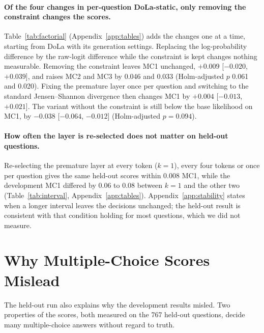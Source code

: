 \documentclass[11pt]{article}
\newcommand{\method}{per-question DoLa-static}
\begin{document}
\paragraph{Of the four changes in \method{}, only removing the constraint changes the scores.}
Table~\ref{tab:factorial} (Appendix~\ref{app:tables}) adds the changes one at a time, starting from DoLa with its generation settings.
Replacing the log-probability difference by the raw-logit difference while the constraint is kept changes nothing
measurable. Removing the constraint leaves MC1 unchanged, $+0.009$ [$-0.020$, $+0.039$], and raises MC2 and MC3 by 0.046 and
0.033 (Holm-adjusted $p$ 0.061 and 0.020).
Fixing the premature layer once per question and switching to the standard Jensen--Shannon divergence then changes
MC1 by $+0.004$ [$-0.013$, $+0.021$]. The variant without the constraint is still below the base likelihood on
MC1, by $-0.038$ [$-0.064$, $-0.012$] (Holm-adjusted $p = 0.094$).

\paragraph{How often the layer is re-selected does not matter on held-out questions.}
Re-selecting the premature layer at every token ($k = 1$), every four tokens or once per question gives the same
held-out scores within $0.008$ MC1, while the development MC1 differed by 0.06 to 0.08 between $k = 1$ and the other two
(Table~\ref{tab:interval}, Appendix~\ref{app:tables}). Appendix~\ref{app:stability} states when a longer interval leaves the decisions unchanged;
the held-out result is consistent with that condition holding for most questions, which we did not measure.

\section{Why Multiple-Choice Scores Mislead}
\label{sec:mislead}

The held-out run also explains why the development results misled. Two properties of the scores, both measured
on the 767 held-out questions, decide many multiple-choice answers without regard to truth.
\end{document}
